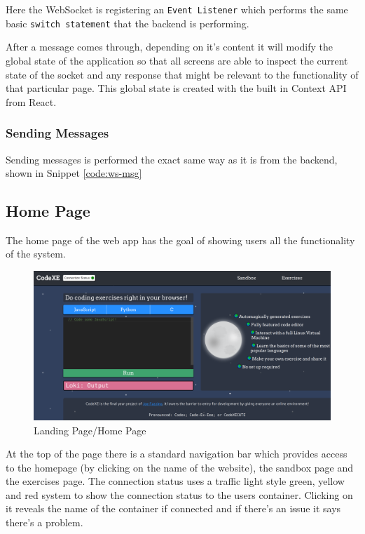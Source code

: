 Here the WebSocket is registering an \texttt{Event Listener} which performs the same basic \texttt{switch statement} that the backend is performing.

After a message comes through, depending on it's content it will modify the global state of the application so that all screens are able to inspect the current state of the socket and any response that might be relevant to the functionality of that particular page. This global state is created with the built in Context API from React.

\subsubsection{Sending Messages} \label{impl-ws-fmsgsnd}

Sending messages is performed the exact same way as it is from the backend, shown in Snippet \ref{code:ws-msg}

\pagebreak

\subsection{Home Page} \label{impl-home-page}

The home page of the web app has the goal of showing users all the functionality of the system.

\begin{figure}[h!]
    \centering
    \includegraphics[width=\linewidth]{res/home_page.png}
    \caption{Landing Page/Home Page}
    \label{fig:homepage}
\end{figure}

At the top of the page there is a standard navigation bar which provides access to the homepage (by clicking on the name of the website), the sandbox page and the exercises page. The connection status uses a traffic light style green, yellow and red system to show the connection status to the users container. Clicking on it reveals the name of the container if connected and if there's an issue it says there's a problem.

